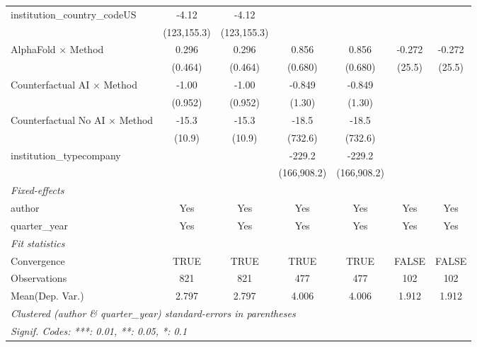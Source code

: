 \begin{tabular}{lcccccc}
   institution\_country\_codeUS          & -4.12        & -4.12        &              &              &             &   \\   
                                         & (123,155.3)  & (123,155.3)  &              &              &             &   \\   
   AlphaFold $\times$ Method             & 0.296        & 0.296        & 0.856        & 0.856        & -0.272      & -0.272\\   
                                         & (0.464)      & (0.464)      & (0.680)      & (0.680)      & (25.5)      & (25.5)\\   
   Counterfactual AI $\times$ Method     & -1.00        & -1.00        & -0.849       & -0.849       &             &   \\   
                                         & (0.952)      & (0.952)      & (1.30)       & (1.30)       &             &   \\   
   Counterfactual No AI $\times$ Method  & -15.3        & -15.3        & -18.5        & -18.5        &             &   \\   
                                         & (10.9)       & (10.9)       & (732.6)      & (732.6)      &             &   \\   
   institution\_typecompany              &              &              & -229.2       & -229.2       &             &   \\   
                                         &              &              & (166,908.2)  & (166,908.2)  &             &   \\   
   \midrule
   \emph{Fixed-effects}\\
   author                                & Yes          & Yes          & Yes          & Yes          & Yes         & Yes\\  
   quarter\_year                         & Yes          & Yes          & Yes          & Yes          & Yes         & Yes\\  
   \midrule
   \emph{Fit statistics}\\
   Convergence                           &TRUE          & TRUE         & TRUE         & TRUE         & FALSE       & FALSE\\  
   Observations                          & 821          & 821          & 477          & 477          & 102         & 102\\  
Mean(Dep. Var.) & 2.797 & 2.797 & 4.006 & 4.006 & 1.912 & 1.912 \\
   \midrule \midrule
   \multicolumn{7}{l}{\emph{Clustered (author \& quarter\_year) standard-errors in parentheses}}\\
   \multicolumn{7}{l}{\emph{Signif. Codes: ***: 0.01, **: 0.05, *: 0.1}}\\
\end{tabular}
\par\endgroup

